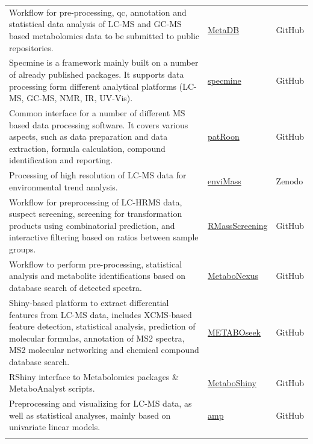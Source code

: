 \documentclass[]{article}
\begin{document}
\begin{longtable}[t]{>{\raggedright\arraybackslash}p{30em}>{\raggedright\arraybackslash}p{10em}>{\raggedright\arraybackslash}p{3em}}
\rowcolor{gray!6}  Workflow for pre-processing, qc, annotation and statistical data analysis of LC-MS and GC-MS based metabolomics data to be submitted to public repositories. & \href{https://github.com/rmylonas/MetaDB}{MetaDB} & GitHub\\
Specmine is a framework mainly built on a number of already published packages. It supports data processing form different analytical platforms (LC-MS, GC-MS, NMR, IR, UV-Vis). & \href{https://github.com/cran/specmine}{specmine} & GitHub\\
\rowcolor{gray!6}  Common interface for a number of different MS based data processing software. It covers various aspects, such as data preparation and data extraction, formula calculation, compound identification and reporting. & \href{https://github.com/rickhelmus/patRoon}{patRoon} & GitHub\\
Processing of high resolution of LC-MS data for environmental trend analysis. & \href{https://zenodo.org/record/1213098}{enviMass} & Zenodo\\
\addlinespace
\rowcolor{gray!6}  Workflow for preprocessing of LC-HRMS data, suspect screening, screening for transformation products using combinatorial prediction, and interactive filtering based on ratios between sample groups. & \href{https://github.com/meowcat/RMassScreening}{RMassScreening} & GitHub\\
Workflow to perform pre-processing, statistical analysis and metabolite identifications based on database search of detected spectra. & \href{https://github.com/tohweizhong/MetaboNexus}{MetaboNexus} & GitHub\\
\rowcolor{gray!6}  Shiny-based platform to extract differential features from LC-MS data, includes XCMS-based feature detection, statistical analysis, prediction of molecular formulas, annotation of MS2 spectra, MS2 molecular networking and chemical compound database search. & \href{https://github.com/mjhelf/METABOseek}{METABOseek} & GitHub\\
RShiny interface to Metabolomics packages {\&} MetaboAnalyst scripts. & \href{https://github.com/UMCUGenetics/MetaboShiny/}{MetaboShiny} & GitHub\\
\rowcolor{gray!6}  Preprocessing and visualizing for LC-MS data, as well as statistical analyses, mainly based on univariate linear models. & \href{https://github.com/antonvsdata/amp}{amp} & GitHub\\*
\end{longtable}

\newpage
\end{document}
